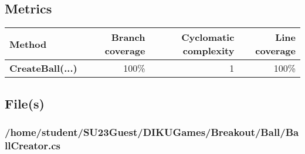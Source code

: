 \documentclass[a4paper,landscape,10pt]{article}
\begin{document}
\subsection{Metrics}
\begin{longtable}[l]{|l|r|r|r|}
\hline
\textbf{Method} & \textbf{Branch coverage} & \textbf{Cyclomatic complexity} & \textbf{Line coverage}\\
\hline
\textbf{CreateBall(...)} & 100\% & 1 & 100\%\\
\hline
\end{longtable}
\subsection{File(s)}
\subsubsection{/home/student/SU23Guest/DIKUGames/Breakout/Ball/BallCreator.cs}
\end{document}
